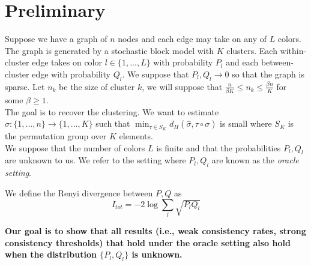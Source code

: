 \documentclass{article}
\begin{document}
\begin{comment}
\begin{lemma}
\label{lem:affinity_renyi}
$$ D_{1/2}(P \| Q) = - 2 \log \sum_x \sqrt{p(x)q(x)}$$ 
and so 
$$ \exp(- D_{1/2}(P \| Q) ) = \left(\sum_x \sqrt{p(x)q(x)} \right)^2$$.
\end{lemma}


Under $H_1$, $A^c$ is the event that $\sum_{i=1}^n \log \frac{p(X_i)}{q(X_i)} \geq \log \frac{p(Y_i)}{q(Y_i)}$ where $X_i \sim Q$ and $Y_i \sim P$. Therefore, $P_0(A) = P_1(A^c)$ and $P_0(A) \geq \frac{1}{4} \exp( - n 2 D_{1/2} (P \| Q))$.

A question arises on whether we can get rid of the 2 in the exponential. 

\end{comment}



\newpage
\section{Preliminary}

Suppose we have a graph of $n$ nodes and each edge may take on any of $L$ colors. The graph is generated by a stochastic block model with $K$ clusters. Each within-cluster edge takes on color $l \in \{1,...,L\}$ with probability $P_l$ and each between-cluster edge with probability $Q_l$. We suppose that $P_l, Q_l \rightarrow 0$ so that the graph is sparse. Let $n_k$ be the size of cluster $k$, we will suppose that $\frac{n}{\beta K} \leq n_k \leq \frac{\beta n}{K}$ for some $\beta \geq 1$. \\

The goal is to recover the clustering. We want to estimate $\hat{\sigma} : \{1,...,n\} \rightarrow \{1,...,K\}$ such that $\min_{\tau \in S_K} d_H( \hat{\sigma}, \tau \circ \sigma)$ is small where $S_K$ is the permutation group over $K$ elements.\\

We suppose that the number of colors $L$ is finite and that the probabilities $P_l, Q_l$ are unknown to us. We refer to the setting where $P_l, Q_l$ are known as the \emph{oracle setting}. 

We define the Renyi divergence between $P,Q$ as
\[
I_{tot} = -2 \log \sum_l \sqrt{P_l Q_l}
\]

\textbf{Our goal is to show that all results (i.e., weak consistency rates, strong consistency thresholds) that hold under the oracle setting also hold when the distribution $\{P_l, Q_l\}$ is unknown. }
\end{document}
